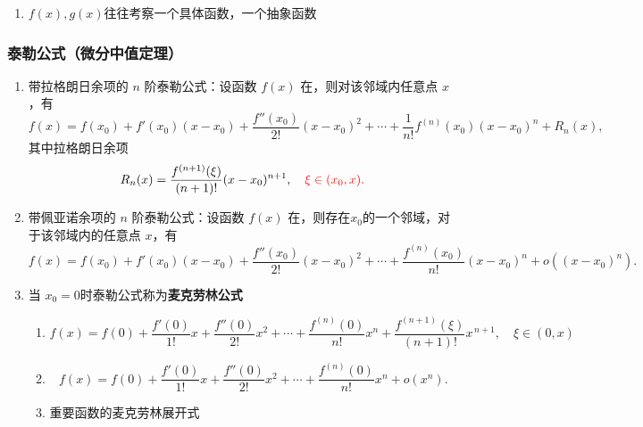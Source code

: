 \documentclass[a4paper,12pt]{article}
\newcommand{\blueuline}[1]{{\color{blue}\uline{\color{black}{#1}}}}
\begin{document}
    \begin{enumerate}
        \item $f(x), g(x)$往往考察一个具体函数，一个抽象函数
    \end{enumerate}

    \subsubsection{泰勒公式（微分中值定理）}

    \begin{enumerate}
        \item 带拉格朗日余项的 $n$ 阶泰勒公式：设函数 $f(x)$ 在{\blueuline{点 $x_0$ 的某邻域内 $n+1$ 阶导数存在}}，则对该邻域内任意点 $x$，有
        \[
            f(x)
            = f(x_0) + f'(x_0)(x-x_0)
            + \frac{f''(x_0)}{2!}(x-x_0)^2
            + \cdots
            + \frac{1}{n!}f^{(n)}(x_0)(x-x_0)^n
            + R_n(x),
        \]
        其中拉格朗日余项
        \[
            R_n(x)
            = \frac{f^{(n+1)}(\xi)}{(n+1)!}(x-x_0)^{n+1},
            \quad \color{red}{\xi \in (x_0, x)}.
        \]

        \item 带佩亚诺余项的 $n$ 阶泰勒公式：设函数 $f(x)$ 在{\blueuline{点 $x_0$ 处 $n$ 阶可导}}，则存在$x_0$的一个邻域，对于该邻域内的任意点 $x$，有
        \[
            f(x)
            = f(x_0) + f'(x_0)(x-x_0)
            + \frac{f''(x_0)}{2!}(x-x_0)^2
            + \cdots
            + \frac{f^{(n)}(x_0)}{n!}(x-x_0)^n
            + o\!\left((x-x_0)^n\right).
        \]
        \item 当 $x_0 = 0$时泰勒公式称为\textbf{麦克劳林公式}
        \begin{enumerate}
            \item \[
                      f(x)
                      = f(0)
                      + \frac{f'(0)}{1!}x
                      + \frac{f''(0)}{2!}x^2
                      + \cdots
                      + \frac{f^{(n)}(0)}{n!}x^n
                      + \frac{f^{(n+1)}(\xi)}{(n+1)!}x^{\,n+1}, \quad \xi \in (0, x)
            \]
            \item \[
                      f(x)
                      = f(0)
                      + \frac{f'(0)}{1!}x
                      + \frac{f''(0)}{2!}x^2
                      + \cdots
                      + \frac{f^{(n)}(0)}{n!}x^n
                      + o(x^n).
            \]
            \item 重要函数的麦克劳林展开式
\end{enumerate}
\end{enumerate}
\end{document}
